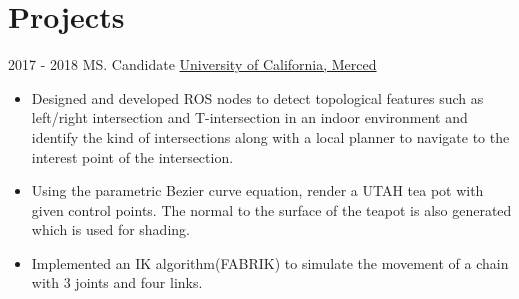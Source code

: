 \documentclass[letterpaper]{twentysecondcv} %
\begin{document}
\section{Projects}
\begin{twenty}
    \twentyitem
    {2017 - 2018}
    {}
    {MS. Candidate}
    {\href{https://www.ucmerced.edu/}{University of California, Merced}}
    {}
    {
        {\begin{itemize}
            \item Designed and developed ROS nodes to detect topological features such as left/right intersection and T-intersection in an indoor environment and identify the kind of intersections along with a local planner to navigate to the interest point of the intersection.
            \item Using the parametric Bezier curve equation, render a UTAH tea pot with given control points. The normal to the surface of the teapot is also generated which is used for shading.
            \item Implemented an IK algorithm(FABRIK) to simulate the movement of a chain with 3 joints and four links.
        \end{itemize}}
    }
\end{twenty}
\end{document}

